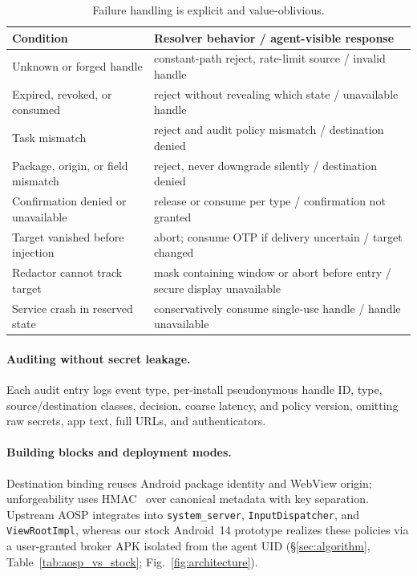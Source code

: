 \begin{table}[t]
\centering
\caption{Failure handling is explicit and value-oblivious.}
\label{tab:failures}
\footnotesize
\renewcommand{\arraystretch}{1.08}
\begin{tabularx}{\columnwidth}{@{}>{\raggedright\arraybackslash}p{2.35cm}>{\raggedright\arraybackslash}X@{}}
\toprule
Condition & Resolver behavior / agent-visible response \\
\midrule
Unknown or forged handle & constant-path reject, rate-limit source / invalid handle \\
Expired, revoked, or consumed & reject without revealing which state / unavailable handle \\
Task mismatch & reject and audit policy mismatch / destination denied \\
Package, origin, or field mismatch & reject, never downgrade silently / destination denied \\
Confirmation denied or unavailable & release or consume per type / confirmation not granted \\
Target vanished before injection & abort; consume OTP if delivery uncertain / target changed \\
Redactor cannot track target & mask containing window or abort before entry / secure display unavailable \\
Service crash in reserved state & conservatively consume single-use handle / handle unavailable \\
\bottomrule
\end{tabularx}
\end{table}

\paragraph{Auditing without secret leakage.} Each audit entry logs event type, per-install pseudonymous handle ID, type, source/destination classes, decision, coarse latency, and policy version, omitting raw secrets, app text, full URLs, and authenticators.

\paragraph{Building blocks and deployment modes.} Destination binding reuses Android package identity and WebView origin; unforgeability uses HMAC~\cite{rfc2104} over canonical metadata with key separation. Upstream AOSP integrates into \texttt{system\_server}, \texttt{InputDispatcher}, and \texttt{ViewRootImpl}, whereas our stock Android~14 prototype realizes these policies via a user-granted broker APK isolated from the agent UID (\S\ref{sec:algorithm}, Table~\ref{tab:aosp_vs_stock}; Fig.~\ref{fig:architecture}).
